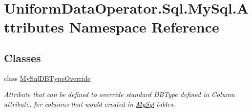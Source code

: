 \hypertarget{namespace_uniform_data_operator_1_1_sql_1_1_my_sql_1_1_attributes}{}\section{Uniform\+Data\+Operator.\+Sql.\+My\+Sql.\+Attributes Namespace Reference}
\label{namespace_uniform_data_operator_1_1_sql_1_1_my_sql_1_1_attributes}
\subsection*{Classes}
\begin{DoxyCompactItemize}
\item 
class \mbox{\hyperlink{class_uniform_data_operator_1_1_sql_1_1_my_sql_1_1_attributes_1_1_my_sql_d_b_type_override}{My\+Sql\+D\+B\+Type\+Override}}
\begin{DoxyCompactList}\small\item\em Attribute that can be defined to override standard D\+B\+Type defined in Column attribute, for columns that would created in \mbox{\hyperlink{namespace_uniform_data_operator_1_1_sql_1_1_my_sql}{My\+Sql}} tables. \end{DoxyCompactList}\end{DoxyCompactItemize}
